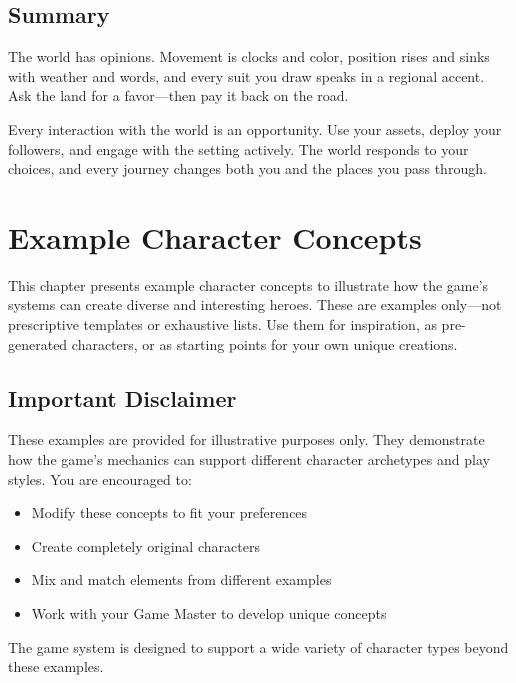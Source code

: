 \documentclass[11pt,twoside,openany]{book}
\begin{document}
\section*{Summary} 

The world has opinions. Movement is clocks and color, position rises and sinks with weather and words, and every suit you draw speaks in a regional accent. Ask the land for a favor—then pay it back on the road.

\begin{tcolorbox}[colback=gray!5!white, colframe=gray!75!black, title=Remember, fonttitle=\bfseries]
Every interaction with the world is an opportunity. Use your assets, deploy your followers, and engage with the setting actively. The world responds to your choices, and every journey changes both you and the places you pass through.
\end{tcolorbox}

\chapter{Example Character Concepts} \label{ch:examples}

This chapter presents example character concepts to illustrate how the game's systems can create diverse and interesting heroes. These are examples only—not prescriptive templates or exhaustive lists. Use them for inspiration, as pre-generated characters, or as starting points for your own unique creations.

\section*{Important Disclaimer} 

These examples are provided for illustrative purposes only. They demonstrate how the game's mechanics can support different character archetypes and play styles. You are encouraged to:
\begin{itemize}
\item Modify these concepts to fit your preferences
\item Create completely original characters
\item Mix and match elements from different examples
\item Work with your Game Master to develop unique concepts
\end{itemize}

The game system is designed to support a wide variety of character types beyond these examples.
\end{document}
